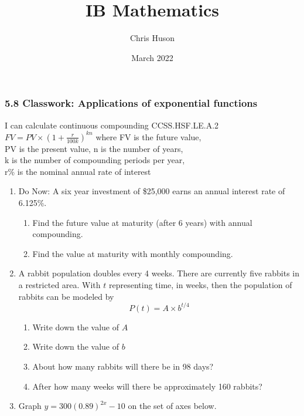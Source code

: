 \documentclass[12pt, twoside]{article}
\title{IB Mathematics}
\author{Chris Huson}
\date{March 2022}
\begin{document}
\subsubsection*{5.8 Classwork: Applications of exponential functions}
I can calculate continuous compounding \hfill CCSS.HSF.LE.A.2 \\[0.5cm]
$\displaystyle FV=PV \times \left(1+\frac{r}{100k} \right)^{kn}$
where FV is the future value,\\[0.25cm]
PV is the present value, n is the number of years, \\
 k is the number of compounding periods per year, \\
 r\% is the nominal annual rate of interest

\begin{enumerate}
\item Do Now: A six year investment of \$25,000 earns an annual interest rate of 6.125\%.
    \begin{enumerate}[itemsep=2cm]
    \item Find the future value at maturity (after 6 years) with annual compounding. 
    \item Find the value at maturity with monthly compounding.
    \end{enumerate} \vspace{2cm}

\item A rabbit population doubles every 4 weeks. There are currently five rabbits in a restricted area. With $t$ representing time, in weeks, then the population of rabbits can be modeled by \[\displaystyle P(t)=A \times b^{t/4}\]
\begin{enumerate}[itemsep=0.75cm]
    \item Write down the value of $A$
    \item Write down the value of $b$
    \item About how many rabbits will there be in 98 days? \vspace{2cm}
    \item After how many weeks will there be approximately 160 rabbits?
\end{enumerate}

\newpage
\item Graph $y=300(0.89)^{2x}-10$ on the set of axes below.
    \begin{center}
    \end{center} %


\end{enumerate}
\end{document}
